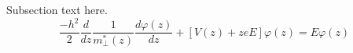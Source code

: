 Subsection text here.
\begin{equation}\label{QCSE}
    \frac{-h^2}{2}
    \frac{d}{dz}
    \frac{1}{m_\perp^*(z)}
    \frac{d\varphi(z)}{dz}
    +[V(z)+zeE]\varphi(z)
        = E\varphi(z)
\end{equation}
